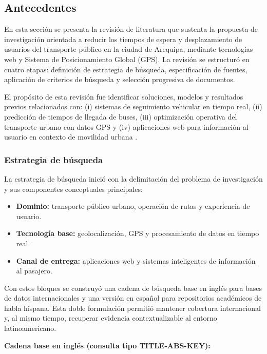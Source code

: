 \subsection{Antecedentes}

En esta sección se presenta la revisión de literatura que sustenta la propuesta de investigación orientada a reducir los tiempos de espera y desplazamiento de usuarios del transporte público en la ciudad de Arequipa, mediante tecnologías web y Sistema de Posicionamiento Global (GPS). La revisión se estructuró en cuatro etapas: definición de estrategia de búsqueda, especificación de fuentes, aplicación de criterios de búsqueda y selección progresiva de documentos.

El propósito de esta revisión fue identificar soluciones, modelos y resultados previos relacionados con: (i) sistemas de seguimiento vehicular en tiempo real, (ii) predicción de tiempos de llegada de buses, (iii) optimización operativa del transporte urbano con datos GPS y (iv) aplicaciones web para información al usuario en contexto de movilidad urbana \cite{hadiwardoyo2018,pradip2014,singla2015,anagnostopoulos2020,wang2021}.

\subsubsection{Estrategia de búsqueda}

La estrategia de búsqueda inició con la delimitación del problema de investigación y sus componentes conceptuales principales:

\begin{itemize}
    \item \textbf{Dominio:} transporte público urbano, operación de rutas y experiencia de usuario.
    \item \textbf{Tecnología base:} geolocalización, GPS y procesamiento de datos en tiempo real.
    \item \textbf{Canal de entrega:} aplicaciones web y sistemas inteligentes de información al pasajero.
\end{itemize}

Con estos bloques se construyó una cadena de búsqueda base en inglés para bases de datos internacionales y una versión en español para repositorios académicos de habla hispana. Esta doble formulación permitió mantener cobertura internacional y, al mismo tiempo, recuperar evidencia contextualizable al entorno latinoamericano.

\textbf{Cadena base en inglés (consulta tipo TITLE-ABS-KEY):}


